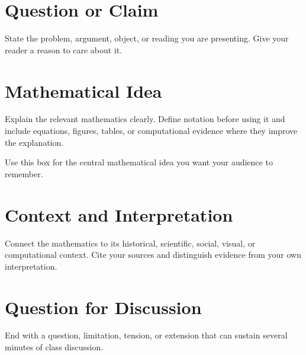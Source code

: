 \documentclass[11pt]{article}
\begin{document}

\section{Question or Claim}
State the problem, argument, object, or reading you are presenting. Give your reader a reason to care about it.

\section{Mathematical Idea}
Explain the relevant mathematics clearly. Define notation before using it and include equations, figures, tables, or computational evidence where they improve the explanation.
\begin{keyidea}
Use this box for the central mathematical idea you want your audience to remember.
\end{keyidea}

\section{Context and Interpretation}
Connect the mathematics to its historical, scientific, social, visual, or computational context. Cite your sources and distinguish evidence from your own interpretation.

\section{Question for Discussion}
End with a question, limitation, tension, or extension that can sustain several minutes of class discussion.
\end{document}
